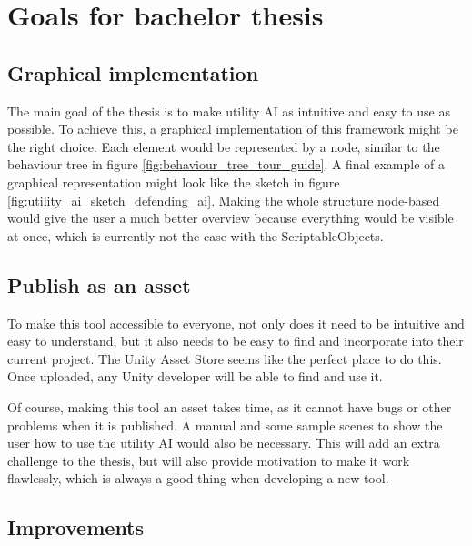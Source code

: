 %

\chapter{Goals for bachelor thesis}
\label{chap:goalsforbachelorthesis}

\section{Graphical implementation}
\label{sec:goalsforbachelorthesis_graphicalimplementation}

The main goal of the thesis is to make utility AI as intuitive and easy to use as possible. To achieve this, a graphical implementation of this framework might be the right choice. Each element would be represented by a node, similar to the behaviour tree in figure \ref{fig:behaviour_tree_tour_guide}. A final example of a graphical representation might look like the sketch in figure \ref{fig:utility_ai_sketch_defending_ai}. Making the whole structure node-based would give the user a much better overview because everything would be visible at once, which is currently not the case with the ScriptableObjects.

\section{Publish as an asset}
\label{sec:goalsforbachelorthesis_publishasanasset}

To make this tool accessible to everyone, not only does it need to be intuitive and easy to understand, but it also needs to be easy to find and incorporate into their current project. The Unity Asset Store seems like the perfect place to do this. Once uploaded, any Unity developer will be able to find and use it.

Of course, making this tool an asset takes time, as it cannot have bugs or other problems when it is published. A manual and some sample scenes to show the user how to use the utility AI would also be necessary. This will add an extra challenge to the thesis, but will also provide motivation to make it work flawlessly, which is always a good thing when developing a new tool.

\section{Improvements}
\label{sec:goalsforbachelorthesis_improvements}

